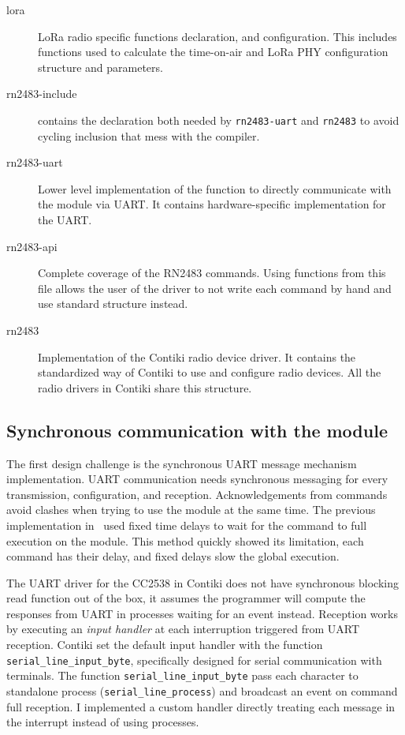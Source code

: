 \begin{description}
  \item[lora] LoRa radio specific functions declaration, and configuration. 
    This includes functions used to calculate the time-on-air and
    LoRa PHY configuration structure and parameters.
  \item[rn2483-include] contains the declaration both needed by
    \lstinline{rn2483-uart} and \lstinline{rn2483} to avoid cycling inclusion
    that mess with the compiler.
  \item[rn2483-uart] Lower level implementation of the function to directly
    communicate with the module via UART\@.
    It contains hardware-specific implementation for the UART\@.
  \item[rn2483-api] Complete coverage of the RN2483 commands. Using functions
    from this file allows the user of the driver to not write
    each command by hand and use standard structure instead.
  \item[rn2483] Implementation of the Contiki radio device driver. 
    It contains the standardized way of Contiki to use and configure radio
    devices.
    All the radio drivers in Contiki share this structure.
\end{description}

\subsection{Synchronous communication with the module}

The first design challenge is the
synchronous UART message mechanism implementation.
UART communication needs synchronous messaging for every
transmission, configuration, and reception.
Acknowledgements from commands avoid 
clashes when trying to use the module at the same time.
The previous implementation in~\cite{8847137} used fixed time delays to 
wait for the command to full execution on the module. This method 
quickly showed its limitation, each command has their delay, and
fixed delays slow the global execution.


The UART driver for the CC2538 in Contiki does not have synchronous 
blocking read function out of the box, it assumes the programmer will compute the
responses from UART in processes waiting for an event instead.
Reception works by executing an \emph{input handler} at each interruption
triggered from UART reception.
Contiki set the default input handler with the function
\lstinline{serial_line_input_byte},
specifically designed for serial communication with terminals. 
The function \lstinline{serial_line_input_byte} pass each character to standalone
process (\lstinline{serial_line_process}) and broadcast an event on command
full reception. 
I implemented a custom handler directly treating each message in the
interrupt instead of using processes.


